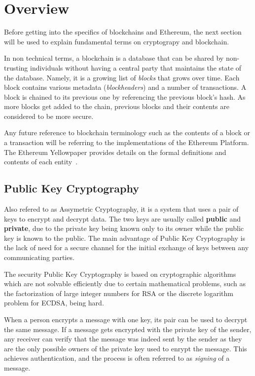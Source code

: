 \section{Overview}
Before getting into the specifics of blockchains and Ethereum, the next section will be used to explain fundamental terms on cryptograpy and blockchain.

In non technical terms, a blockchain is a database that can be shared by non-trusting individuals without having a central party that maintains the state of the database. Namely, it is a growing list of \textit{blocks} that grows over time. Each block contains various metadata (\textit{blockheaders}) and a number of transactions. A block is chained to its previous one by referencing the previous block's hash. As more blocks get added to the chain, previous blocks and their contents are considered to be more secure.

Any future reference to blockchain terminology such as the contents of a block or a transaction will be referring to the implementations of the Ethereum Platform. The Ethereum Yellowpaper provides details on the formal definitions and contents of each entity~\cite{ethereum}.

\subsection{Public Key Cryptography}
Also refered to as Assymetric Cryptography, it is a system that uses a pair of keys to encrypt and decrypt data. The two keys are usually called \textbf{public} and \textbf{private}, due to the private key being known only to its owner while the public key is known to the public. The main advantage of Public Key Cryptography is the lack of need for a secure channel for the initial exchange of keys between any communicating parties.

The security Public Key Cryptography is based on cryptographic algorithms which are not solvable efficiently due to certain mathematical problems, such as the factorization of large integer numbers for RSA or the discrete logarithm problem for ECDSA, being hard.

When a person encrypts a message with one key, its pair can be used to decrypt the same message. If a message gets encrypted with the private key of the sender, any receiver can verify that the message was indeed sent by the sender as they are the only possible owners of the private key used to enrypt the message. This achieves authentication, and the process is often referred to as \textit{signing} of a message. 

